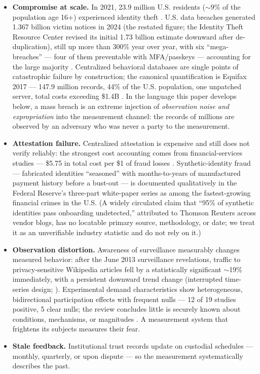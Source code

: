 \documentclass[11pt,twocolumn]{article}
\providecommand{\tightlist}{\setlength{\itemsep}{0pt}\setlength{\parskip}{0pt}}
\begin{document}
\begin{itemize}
\tightlist
\item
  \textbf{Compromise at scale.} In 2021, 23.9 million U.S. residents
  ($\sim$9\% of the population age 16+) experienced identity
  theft \citep{bjs2023}. U.S. data breaches generated 1.367 billion
  victim notices in 2024 (the restated figure; the Identity Theft
  Resource Center revised its initial 1.73 billion estimate downward
  after de-duplication), still up more than 300\% year over year, with
  six ``mega-breaches'' --- four of them preventable with MFA/passkeys
  --- accounting for the large majority \citep{itrc2025}. Centralized
  behavioral databases are single points of catastrophic failure by
  construction; the canonical quantification is Equifax 2017 --- 147.9
  million records, 44\% of the U.S. population, one unpatched server,
  total costs exceeding \$1.4B \citep{ftc2019}. In the language this
  paper develops below, a mass breach is an extreme injection of
  \emph{observation noise and expropriation} into the measurement
  channel: the records of millions are observed by an adversary who was
  never a party to the measurement.
\item
  \textbf{Attestation failure.} Centralized attestation is expensive and
  still does not verify reliably: the strongest cost accounting comes
  from financial-services studies --- \$5.75 in total cost per \$1 of
  fraud losses \citep{lexisnexis2025}. Synthetic-identity fraud ---
  fabricated identities ``seasoned'' with months-to-years of
  manufactured payment history before a bust-out --- is documented
  qualitatively in the Federal Reserve's three-part white-paper series
  \citep{fed2019} as among the fastest-growing financial crimes in the
  U.S. (A widely circulated claim that ``95\% of synthetic identities
  pass onboarding undetected,'' attributed to Thomson Reuters across
  vendor blogs, has no locatable primary source, methodology, or date;
  we treat it as an unverifiable industry statistic and do not rely on
  it.)
\item
  \textbf{Observation distortion.} Awareness of surveillance measurably
  changes measured behavior: after the June 2013 surveillance
  revelations, traffic to privacy-sensitive Wikipedia articles fell by a
  statistically significant $\sim$19\% immediately, with a
  persistent downward trend change (interrupted time-series design;
  \citealp{penney2016}). Experimental demand characteristics show
  heterogeneous, bidirectional participation effects with frequent nulls
  --- 12 of 19 studies positive, 5 clear nulls; the review concludes
  little is securely known about conditions, mechanisms, or magnitudes
  \citep{mccambridge2014}. A
  measurement system that frightens its subjects measures their fear.
\item
  \textbf{Stale feedback.} Institutional trust records update on
  custodial schedules --- monthly, quarterly, or upon dispute --- so the
  measurement systematically describes the past.
\end{itemize}
\end{document}
